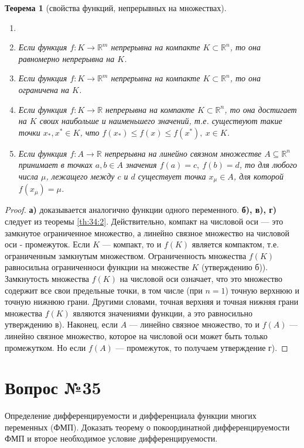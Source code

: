 \documentclass[12pt]{report}
\numberwithin{equation}{section}
\newtheorem{theorem}{Теорема}[section]
\begin{document}
\begin{theorem}[свойства функций, непрерывных на множествах] \label{th:34:3}
\begin{enumerate}
\item[]
\item[а)] Если функция $f: K \to \mathbb{R}^m$ непрерывна на компакте $K \subset \mathbb{R}^n$, то она равномерно непрерывна на $K$.
\item[б)] Если функция $f: K \to \mathbb{R}^m$ непрерывна на компакте $K \subset \mathbb{R}^n$, то она ограничена на $K$.
\item[в)] Если функция $f: K \to \mathbb{R}$ непрерывна на компакте $K \subset \mathbb{R}^n$, то она достигает на $K$ своих наибольше и наименьшего значений, т.е. существуют такие точки $x_*,x^* \in K$, что $f(x_*) \leqslant f(x) \leqslant f(x^*),~x\in K$.
\item[г)] Если функция $f: A \to \mathbb{R}$ непрерывна на линейно связном множестве $A \subseteq \mathbb{R}^n$ принимает в точках $a,b \in A$ значения $f(a) = c,~f(b) = d$, то для любого числа $\mu$, лежащего между $c$ и $d$ существует точка $x_{\mu} \in A$, для которой  $f(x_{\mu}) = \mu$.
\end{enumerate}
\end{theorem}
\begin{proof}
\textbf{а)} доказывается аналогично функции одного переменного. \textbf{б), в), г)} следует из теоремы \ref{th:34:2}. Действительно, компакт на числовой оси --- это замкнутое ограниченное множество, а линейно связное множество на числовой оси - промежуток. Если $K$ --- компакт, то и $f(K)$ является компактом, т.е. ограниченным замкнутым множеством. Ограниченность множества $f(K)$ равносильна ограниченноси функции на множестве $K$ (утверждению б)). Замкнутость множества $f(K)$ на числовой оси означает, что это множество содержит все свои предельные точки, в том числе (при $n = 1$) точную верхнюю и точную нижнюю грани. Другими словами, точная верхняя и точная нижняя грани  множества $f(K)$ являются значениями функции, а это равносильно утверждению в). Наконец, если $A$ --- линейно связное множество, то и $f(A)$ --- линейно связное множество, которое на числовой оси может быть только промежутком. Но если $f(A)$ --- промежуток, то получаем утверждение г).
\end{proof}

\newpage \section{Вопрос №35} %
\begin{framed}
Определение дифференцируемости и дифференциала функции многих переменных (ФМП). Доказать теорему о покоординатной дифференцируемости ФМП и второе необходимое условие дифференцируемости.
\end{framed}
\end{document}
